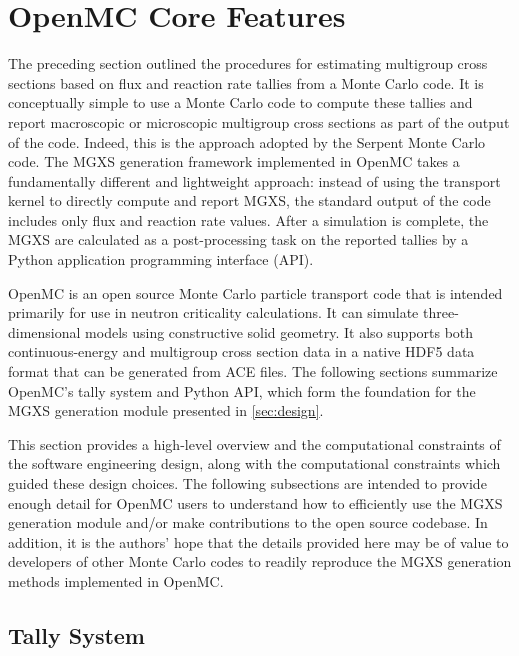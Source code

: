 \section{OpenMC Core Features}
\label{sec:openmc}

The preceding section outlined the procedures for estimating multigroup cross sections based on flux and reaction rate tallies from a Monte Carlo code. It is conceptually simple to use a Monte Carlo code to compute these tallies and report macroscopic or microscopic multigroup cross sections as part of the output of the code. Indeed, this is the approach adopted by the Serpent Monte Carlo code\cite{leppanen2016homog}. The MGXS generation framework implemented in OpenMC takes a fundamentally different and lightweight approach: instead of using the transport kernel to directly compute and report MGXS, the standard output of the code includes only flux and reaction rate values. After a simulation is complete, the MGXS are calculated as a post-processing task on the reported tallies by a Python application programming interface (API).

OpenMC is an open source Monte Carlo particle transport code that is intended primarily for use in neutron criticality calculations. It can simulate three-dimensional models using constructive solid geometry. It also supports both continuous-energy and multigroup cross section data in a native HDF5\cite{koranne2011hdf5} data format\cite{romano2017epjwoc} that can be generated from ACE files. The following sections summarize OpenMC's tally system and Python API, which form the foundation for the MGXS generation module presented in \cref{sec:design}. 

This section provides a high-level overview and the computational constraints of the software engineering design, along with the computational constraints which guided these design choices. The following subsections are intended to provide enough detail for OpenMC users to understand how to efficiently use the MGXS generation module and/or make contributions to the open source codebase. In addition, it is the authors' hope that the details provided here may be of value to developers of other Monte Carlo codes to readily reproduce the MGXS generation methods implemented in OpenMC.

\subsection{Tally System}
\label{subsec:tallies}

